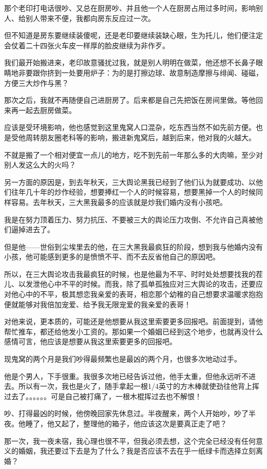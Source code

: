 \documentclass[9pt, b5paper]{article}
\begin{document}
那个老印打电话很吵、又总在厨房吵、并且他一个人在厨房占用过多时间，影响别人、给别人带来不便，我都向房东反应过一次。

但不知道是房东要继续装傻呢，还是老印要继续装缺心眼，生为托儿，他们便注定会仗着二十四张火车皮一样厚的脸皮继续为非作歹。

我们最开始搬进来，老印故意骚扰过我，就是别人明明在做菜，他还想不长鼻子眼睛地非要跟你挤到一处要用炉子：为的是打擦边球、故意制造摩擦与绯闻、碰磁，方便三大炒作与黑？

那次之后，我就不再随便自己进厨房了。后来都是自己先把饭在房间里做。等他回来再一起去厨房做菜。

应该是受环境影响，他也感觉到这里鬼窝人口混杂，吃东西当然不如先前方便。也是受他周转朋友圈老科等的影响，搬进新鬼窝后，越到后来，他对我的火越大。

不就是搬了一个相对便宜一点儿的地方，吃不到先前一年那么多的大肉嘛，至少对别人发这么大的火吗？

另一方面的原因是，到去年秋天，三大舆论黑我已经到了他们认为就要成功、以他们往年几十年的炒作经验，想要捧红一个人的时候容易，想要黑掉一个人的时候同样容易。去年秋天，三大黑我最多的应该就是炒我们婚内没有小孩吧。

我是在努力顶着压力、努力抗压、不要被三大的舆论压力攻倒、不允许自己真被他们逼掉进去了。

但是他——世俗到尘埃里去的他，在三大黑我最疯狂的阶段，想到我与他婚内没有小孩，他可能感到更多的是愤愤不平、而不去反省他自己的原因吧。

所以，在三大舆论攻击我最疯狂的时候，也是他最为不平、时时处处想要找我的茬儿、以发泄他心中不平的时候。而我，除了孤单孤独应对三大舆论的攻击，还要应对他心中的不平，极其想恋我亲爱的表哥，相恋那个幼稚的自己想要求温暖求抱抱便就能够对我倍加宠爱、给予我无限宠爱的我亲爱的表哥！

对他来说，更本质的，可能还是他想要从我这里索要更多回报吧。前面提到，请他帮忙推车，都还给他发小工资的。那如果一个婚姻已经到这个地步，也就再没什么感情可言，他应该是想要从我这里索要更多的回报吧。

现鬼窝的两个月是我们吵得最频繁也是最凶的两个月，也很多次地动过手。

他是个男人，下手很重。我很多次地已经告诉过他，他手太重，但他永远听不进去。所以有一次，我也是火了，随手拿起一根1/4英寸的方木棒就使劲往他背上挥过去了。。。。。。可是自己被打痛了，一根木棍挥过去也不解恨！

吵、打得最凶的时候，他傍晚回家先休息过。半夜醒来，两个人开始吵，吵了半夜。他睡了，他又起了，整理他的箱子，他应该这次是要真正走了吧？

那一次，我一夜未宿，我心理也很不平，但我必须去想，这个完全已经没有任何意义的婚姻，我还要过下去是为了什么？我是否应该不去在乎一纸绿卡而选择立刻离婚？
\end{document}
